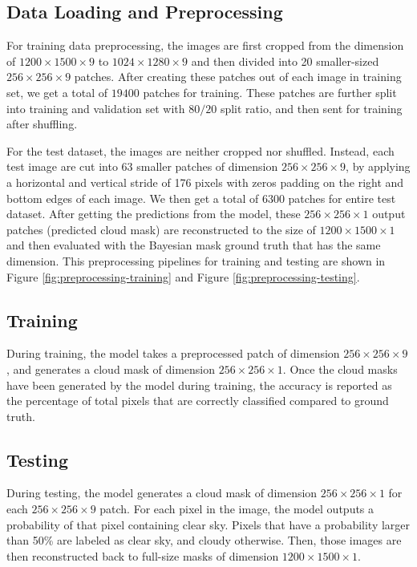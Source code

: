 \documentclass[sigplan,screen]{acmart}
\begin{document}
\subsection{Data Loading and Preprocessing} \label{Preprocessing}

For training data preprocessing, the images are first cropped from the dimension of $1200 \times 1500 \times 9$ to $1024 \times 1280 \times 9$ and then divided into 20 smaller-sized $256 \times 256 \times 9$ patches. After creating these patches out of each image in training set, we get a total of $19400$ patches for training. These patches are further split into training and validation set with $80/20$ split ratio, and then sent for training after shuffling. 

For the test dataset, the images are neither cropped nor shuffled. Instead, each test image are cut into 63 smaller patches of dimension $256 \times 256 \times 9$, by applying a horizontal and vertical stride of 176 pixels with zeros padding on the right and bottom edges of each image. We then get a total of $6300$ patches for entire test dataset. After getting the predictions from the model, these $256 \times 256 \times 1$ output patches (predicted cloud mask) are reconstructed to the size of $1200 \times 1500 \times 1$ and then evaluated with the Bayesian mask ground truth that has the same dimension. This preprocessing pipelines for training and testing are shown in Figure \ref{fig:preprocessing-training} and Figure \ref{fig:preprocessing-testing}.

\subsection{Training}

During training, the model takes a preprocessed patch of dimension $256 \times 256 \times 9$, and generates a cloud mask of dimension $256 \times 256 \times 1$. Once the cloud masks have been generated by the model during training, the accuracy is reported as the percentage of total pixels that are correctly classified compared to ground truth. 

\subsection{Testing}

During testing, the model generates a cloud mask of dimension $256 \times 256 \times 1$ for each $256 \times 256 \times 9$ patch. For each pixel in the image, the model outputs a probability of that pixel containing clear sky. Pixels that have a probability larger than 50\% are labeled as clear sky, and cloudy otherwise. Then, those images are then reconstructed back to full-size masks of dimension $1200 \times 1500 \times 1$. 
\end{document}
